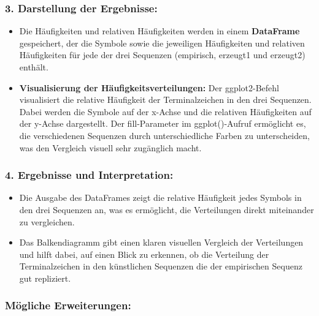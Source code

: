 \documentclass[
]{article}
\begin{document}
\subsubsection{\texorpdfstring{\textbf{3. Darstellung der
Ergebnisse:}}{3. Darstellung der Ergebnisse:}}\label{darstellung-der-ergebnisse}

\begin{itemize}
\item
  Die Häufigkeiten und relativen Häufigkeiten werden in einem
  \textbf{DataFrame} gespeichert, der die Symbole sowie die jeweiligen
  Häufigkeiten und relativen Häufigkeiten für jede der drei Sequenzen
  (empirisch, erzeugt1 und erzeugt2) enthält.
\item
  \textbf{Visualisierung der Häufigkeitsverteilungen:} Der
  ggplot2-Befehl visualisiert die relative Häufigkeit der
  Terminalzeichen in den drei Sequenzen. Dabei werden die Symbole auf
  der x-Achse und die relativen Häufigkeiten auf der y-Achse
  dargestellt. Der fill-Parameter im ggplot()-Aufruf ermöglicht es, die
  verschiedenen Sequenzen durch unterschiedliche Farben zu
  unterscheiden, was den Vergleich visuell sehr zugänglich macht.
\end{itemize}

\subsubsection{\texorpdfstring{\textbf{4. Ergebnisse und
Interpretation:}}{4. Ergebnisse und Interpretation:}}\label{ergebnisse-und-interpretation}

\begin{itemize}
\item
  Die Ausgabe des DataFrames zeigt die relative Häufigkeit jedes Symbols
  in den drei Sequenzen an, was es ermöglicht, die Verteilungen direkt
  miteinander zu vergleichen.
\item
  Das Balkendiagramm gibt einen klaren visuellen Vergleich der
  Verteilungen und hilft dabei, auf einen Blick zu erkennen, ob die
  Verteilung der Terminalzeichen in den künstlichen Sequenzen die der
  empirischen Sequenz gut repliziert.
\end{itemize}

\subsubsection{\texorpdfstring{\textbf{Mögliche
Erweiterungen:}}{Mögliche Erweiterungen:}}\label{muxf6gliche-erweiterungen}
\end{document}
